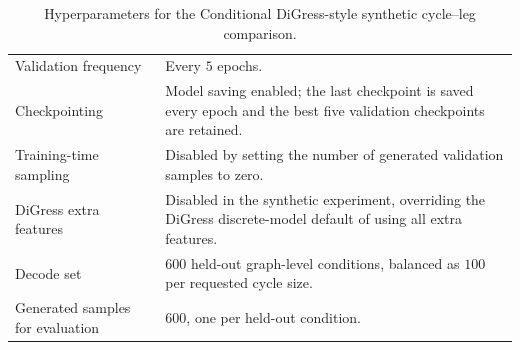 \begin{table}[p]
\begin{tabularx}{\textwidth}{@{}p{}X@{}}
Validation frequency & Every \(5\) epochs. \\
Checkpointing & Model saving enabled; the last checkpoint is saved every epoch and the best five validation checkpoints are retained. \\
Training-time sampling & Disabled by setting the number of generated validation samples to zero. \\
DiGress extra features & Disabled in the synthetic experiment, overriding the DiGress discrete-model default of using all extra features. \\
Decode set & \(600\) held-out graph-level conditions, balanced as \(100\) per requested cycle size. \\
Generated samples for evaluation & \(600\), one per held-out condition. \\
\bottomrule
\end{tabularx}
\caption{Hyperparameters for the Conditional DiGress-style synthetic cycle--leg comparison.}
\label{tab:synthetic-cycle-leg-digress-hyperparameters}
\end{table}

